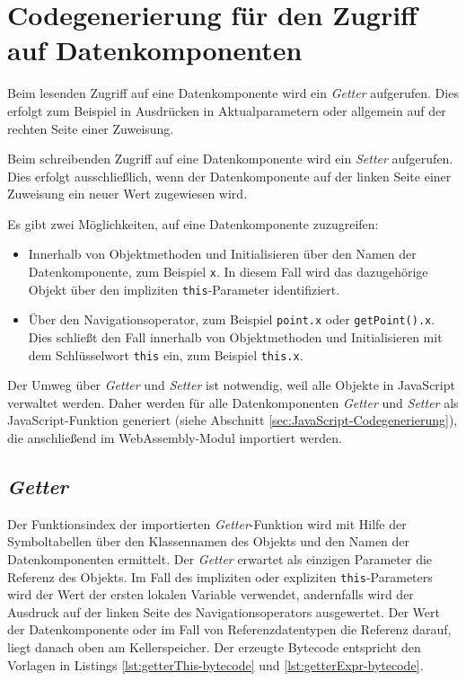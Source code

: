 

\section{Codegenerierung für den Zugriff auf Datenkomponenten}

Beim lesenden Zugriff auf eine Datenkomponente wird ein \emph{Getter} aufgerufen. Dies erfolgt zum Beispiel in Ausdrücken in Aktualparametern oder allgemein auf der rechten Seite einer Zuweisung.

Beim schreibenden Zugriff auf eine Datenkomponente wird ein \emph{Setter} aufgerufen. Dies erfolgt ausschließlich, wenn der Datenkomponente auf der linken Seite einer Zuweisung ein neuer Wert zugewiesen wird.

Es gibt zwei Möglichkeiten, auf eine Datenkomponente zuzugreifen:
\begin{itemize}
    \item Innerhalb von Objektmethoden und Initialisieren über den Namen der Datenkomponente, zum Beispiel \lstinline{x}. In diesem Fall wird das dazugehörige Objekt über den impliziten \lstinline{this}-Parameter identifiziert.
    \item Über den Navigationsoperator, zum Beispiel \lstinline{point.x} oder \lstinline{getPoint().x}. Dies schließt den Fall innerhalb von Objektmethoden und Initialisieren mit dem Schlüsselwort \lstinline{this} ein, zum Beispiel \lstinline{this.x}.
\end{itemize}

Der Umweg über \emph{Getter} und \emph{Setter} ist notwendig, weil alle Objekte in JavaScript verwaltet werden. Daher werden für alle Datenkomponenten \emph{Getter} und \emph{Setter} als JavaScript-Funktion generiert (siehe Abschnitt \ref{sec:JavaScript-Codegenerierung}), die anschließend im WebAssembly-Modul importiert werden.

\subsection{\emph{Getter}}

Der Funktionsindex der importierten \emph{Getter}-Funktion wird mit Hilfe der Symboltabellen über den Klassennamen des Objekts und den Namen der Datenkomponenten ermittelt. Der \emph{Getter} erwartet als einzigen Parameter die Referenz des Objekts. Im Fall des impliziten oder expliziten \lstinline{this}-Parameters wird der Wert der ersten lokalen Variable verwendet, andernfalls wird der Ausdruck auf der linken Seite des Navigationsoperators ausgewertet. Der Wert der Datenkomponente oder im Fall von Referenzdatentypen die Referenz darauf, liegt danach oben am Kellerspeicher. Der erzeugte Bytecode entspricht den Vorlagen in Listings \ref{lst:getterThis-bytecode} und \ref{lst:getterExpr-bytecode}.

